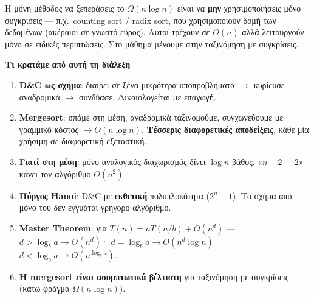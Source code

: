 \documentclass[11pt,a4paper]{article}
\begin{document}
\begin{intuition}
Η μόνη μέθοδος να ξεπεράσεις το $\Omega(n \log n)$ είναι να \textbf{μην}
χρησιμοποιήσεις μόνο συγκρίσεις --- π.χ.\ counting sort / radix sort, που
χρησιμοποιούν δομή των δεδομένων (ακέραιοι σε γνωστό εύρος). Αυτοί τρέχουν σε
$O(n)$ αλλά λειτουργούν μόνο σε ειδικές περιπτώσεις. Στο μάθημα μένουμε στην
ταξινόμηση με συγκρίσεις.
\end{intuition}

\begin{recapbox}
\textbf{Τι κρατάμε από αυτή τη διάλεξη}
\begin{enumerate}
  \item \textbf{D\&C ως σχήμα}: διαίρει σε ξένα μικρότερα υποπροβλήματα $\to$
  κυρίευσε αναδρομικά $\to$ συνδύασε. Δικαιολογείται με επαγωγή.
  \item \textbf{Mergesort}: σπάμε στη μέση, αναδρομικά ταξινομούμε, συγχωνεύουμε
  με γραμμικό κόστος $\to O(n \log n)$. \textbf{Τέσσερις διαφορετικές
  αποδείξεις}, κάθε μία χρήσιμη σε διαφορετική εξεταστική.
  \item \textbf{Γιατί στη μέση}: μόνο αναλογικός διαχωρισμός δίνει $\log n$
  βάθος. «$n-2$ $+$ $2$» κάνει τον αλγόριθμο $\Theta(n^2)$.
  \item \textbf{Πύργος Hanoi}: D\&C με \textbf{εκθετική} πολυπλοκότητα
  ($2^n - 1$). Το σχήμα από μόνο του δεν εγγυάται γρήγορο αλγόριθμο.
  \item \textbf{Master Theorem}: για $T(n) = a T(n/b) + O(n^d)$ ---
  $d > \log_b a \to O(n^d)$· $d = \log_b a \to O(n^d \log n)$·
  $d < \log_b a \to O(n^{\log_b a})$.
  \item \textbf{Η mergesort είναι ασυμπτωτικά βέλτιστη} για ταξινόμηση με
  συγκρίσεις (κάτω φράγμα $\Omega(n \log n)$).
\end{enumerate}
\end{recapbox}

\lecturefooter
\end{document}
